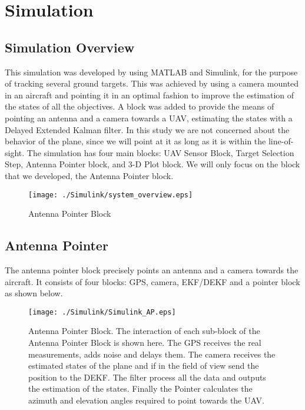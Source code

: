 \chapter{Simulation}
\label{ch:simulation}

\section{Simulation Overview}
This simulation was developed by \cite{Sharma2013} using MATLAB and Simulink, for the purpose of tracking several ground targets. This was achieved by using a camera mounted in an aircraft and pointing it in an optimal fashion to improve the estimation of the states of all the objectives. A block was added to provide the means of pointing an antenna and a camera towards a UAV, estimating the states with a Delayed Extended Kalman filter. In this study we are not concerned about the behavior of the plane, since we will point at it as long as it is within the line-of-sight. The simulation has four main blocks: UAV Sensor Block, Target Selection Step, Antenna Pointer block, and 3-D Plot block. We will only focus on the block that we developed, the Antenna Pointer block.

\begin{figure}[h!]
  \texttt{[image: ./Simulink/system\_overview.eps]}
  \label{fig:system_overview}
  \caption[Antenna Pointer Block]{Antenna Pointer Block}
\end{figure}


\section{Antenna Pointer}
The antenna pointer block precisely points an antenna and a camera towards the aircraft. It consists of four blocks: GPS, camera, EKF/DEKF and a pointer block as shown below.
 
\begin{figure}[h!]
  \texttt{[image: ./Simulink/Simulink\_AP.eps]}
  \label{fig:AP}
  \caption[Antenna Pointer Block]{Antenna Pointer Block. The interaction of each sub-block of the Antenna Pointer Block is shown here. The GPS receives the real measurements, adds noise and delays them. The camera receives the estimated states of the plane and if in the field of view send the position to the DEKF. The filter process all the data and outputs the estimation of the states. Finally the Pointer calculates the azimuth and elevation angles required to point towards the UAV.}
\end{figure}

